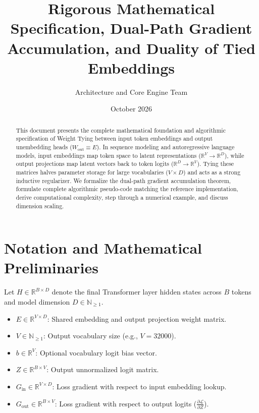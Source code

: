 \documentclass[11pt,a4paper]{article}
\title{\textbf{Rigorous Mathematical Specification, Dual-Path Gradient Accumulation, and Duality of Tied Embeddings}}
\author{Architecture and Core Engine Team}
\date{October 2026}
\theoremstyle{definition}
\begin{document}
\maketitle

\begin{abstract}
This document presents the complete mathematical foundation and algorithmic specification of Weight Tying between input token embeddings and output unembedding heads ($W_{\text{out}} \equiv E$). In sequence modeling and autoregressive language models, input embeddings map token space to latent representations ($\mathbb{R}^V \to \mathbb{R}^D$), while output projections map latent vectors back to token logits ($\mathbb{R}^D \to \mathbb{R}^V$). Tying these matrices halves parameter storage for large vocabularies ($V \times D$) and acts as a strong inductive regularizer. We formalize the dual-path gradient accumulation theorem, formulate complete algorithmic pseudo-code matching the reference implementation, derive computational complexity, step through a numerical example, and discuss dimension scaling.
\end{abstract}

\section{Notation and Mathematical Preliminaries}

Let $H \in \mathbb{R}^{B \times D}$ denote the final Transformer layer hidden states across $B$ tokens and model dimension $D \in \mathbb{N}_{\ge 1}$.

\begin{itemize}
    \item $E \in \mathbb{R}^{V \times D}$: Shared embedding and output projection weight matrix.
    \item $V \in \mathbb{N}_{\ge 1}$: Output vocabulary size (e.g., $V = 32000$).
    \item $b \in \mathbb{R}^V$: Optional vocabulary logit bias vector.
    \item $Z \in \mathbb{R}^{B \times V}$: Output unnormalized logit matrix.
    \item $G_{\text{in}} \in \mathbb{R}^{V \times D}$: Loss gradient with respect to input embedding lookup.
    \item $G_{\text{out}} \in \mathbb{R}^{B \times V}$: Loss gradient with respect to output logits ($\frac{\partial \mathcal{L}}{\partial Z}$).
\end{itemize}
\end{document}
